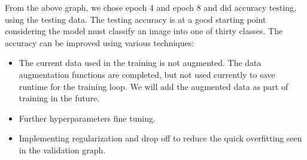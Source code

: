 \documentclass{article} %
\begin{document}
From the above graph, we chose epoch 4 and epoch 8 and did accuracy testing, using the testing data. The testing accuracy is at a good starting point considering the model must classify an image into one of thirty classes. The accuracy can be improved using various techniques:
\begin{itemize}
    \item The current data used in the training is not augmented. The data augmentation functions are completed, but not used currently to save runtime for the training loop. We will add the augmented data as part of training in the future.
    \item Further hyperparameters fine tuning.
    \item Implementing regularization and drop off to reduce the quick overfitting seen in the validation graph.
\end{itemize}


\label{last_page}



\end{document}
